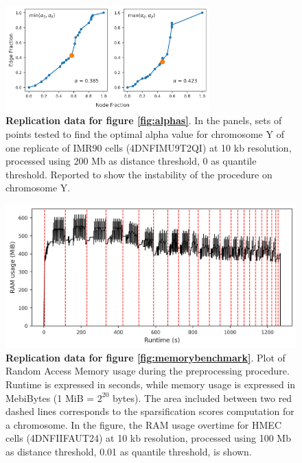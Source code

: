 \begin{figure}[h]
  \centering 
  \includegraphics[width=0.7\textwidth]{alphas_rep2.png}
  \caption{\textbf{Replication data for figure \ref{fig:alphas}}. In the panels, sets of points tested to find the optimal alpha value for chromosome Y of one replicate of IMR90 cells (4DNFIMU9T2QI) at 10 kb resolution, processed using 200 Mb as distance threshold, 0 as quantile threshold. Reported to show the instability of the procedure on chromosome Y.}
\end{figure}

\begin{figure}[h]
  \centering 
  \includegraphics[width=1\textwidth]{memory_rep1.png}
  \caption{\textbf{Replication data for figure \ref{fig:memorybenchmark}}. Plot of Random Access Memory usage during the preprocessing procedure. Runtime is expressed in seconds, while memory usage is expressed in MebiBytes (1 MiB = $2^{20}$ bytes). The area included between two red dashed lines corresponds to the sparsification scores computation for a chromosome. In the figure, the RAM usage overtime for HMEC cells (4DNFIIFAUT24) at 10 kb resolution, processed using 100 Mb as distance threshold, 0.01 as quantile threshold, is shown.}
\end{figure}